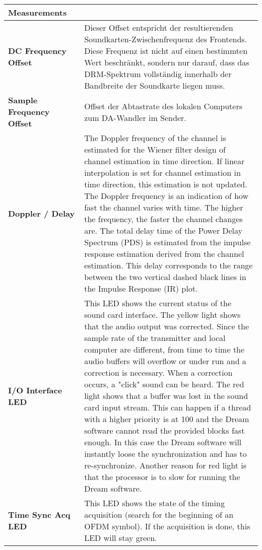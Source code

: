 \begin{table}[h]
	\begin{center}
		\begin{tabular}{p{0.3\linewidth} | p{0.7 \linewidth}}	
			\textbf{Measurements} & \\
			\hline
			\textbf{DC Frequency Offset} & Dieser Offset entspricht der resultierenden Soundkarten-Zwischenfrequenz des Frontends. Diese Frequenz ist nicht auf einen bestimmten Wert beschränkt, sondern nur darauf, dass das DRM-Spektrum vollständig innerhalb der Bandbreite der Soundkarte liegen muss.\\
			
			\textbf{Sample Frequency Offset} & Offset der Abtastrate des lokalen Computers zum DA-Wandler im Sender. \\
			
			\textbf{Doppler / Delay} & The Doppler frequency of the channel is estimated for the Wiener filter design of channel estimation in time direction. If linear interpolation is set for channel estimation in time direction, this estimation is not updated. The Doppler frequency is an indication of how fast the channel varies with time. The higher the frequency, the faster the channel changes are.
			The total delay time of the Power Delay Spectrum (PDS) is estimated from the impulse response estimation derived from the channel estimation. This delay corresponds to the range between the two vertical dashed black lines in the Impulse Response (IR) plot. \\
			\textbf{I/O Interface LED} & This LED shows the current status of the sound card interface. The yellow light shows that the audio output was corrected. Since the sample rate of the transmitter and local computer are different, from time to time the audio buffers will overflow or under run and a correction is necessary. When a correction occurs, a "click" sound can be heard. The red light shows that a buffer was lost in the sound card input stream. This can happen if a thread with a higher priority is at 100 and the Dream software cannot read the provided blocks fast enough. In this case the Dream software will instantly loose the synchronization and has to re-synchronize. Another reason for red light is that the processor is to slow for running the Dream software.
			\\
			\textbf{Time Sync Acq LED} & This LED shows the state of the timing acquisition (search for the beginning of an OFDM symbol). If the acquisition is done, this LED will stay green.
			\\

\end{tabular}
\end{center}
\end{table}
